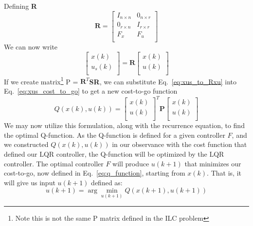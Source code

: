 Defining \textbf{R}
\begin{equation}
    \textbf{R}=\left[\begin{matrix}I_{n\times n}&0_{n\times r}\\0_{r\times n}&I_{r\times r}\\F_x&F_u\\\end{matrix}\right]
\end{equation}
We can now write
\begin{equation}
    \left[\begin{matrix}x\left(k\right)\\u_s\left(k\right)\\\end{matrix}\right]=\textbf{R}\left[\begin{matrix}x\left(k\right)\\u\left(k\right)\\\end{matrix}\right]
    \label{eq:xus_to_Rxu}
\end{equation}
If we create matrix\footnote{Note this is not the same P matrix defined in the ILC problem} P = $\textbf{R}^{T}$\textbf{SR}, we can substitute Eq.~\ref{eq:xus_to_Rxu} into Eq.~\ref{eq:xus_cost_to_go} to get a new cost-to-go function
\begin{equation}
    Q\left(x\left(k\right),u\left(k\right)\right)={\left[\begin{matrix}x\left(k\right)\\u\left(k\right)\\\end{matrix}\right]}^T\textbf{P}\left[\begin{matrix}x\left(k\right)\\u\left(k\right)\\\end{matrix}\right] 
    \label{eq:q_function}
\end{equation}
We may now utilize this formulation, along with the recurrence equation, to find the optimal Q-function. As the Q-function is defined for a given controller $F$, and we constructed $Q\left(x\left(k\right),u\left(k\right)\right)$ in our observance with the cost function that defined our LQR controller, the Q-function will be optimized by the LQR controller.
The optimal controller $F$ will produce $u\left(k+1\right)$ that minimizes our cost-to-go, now defined in Eq.~\ref{eq:q_function}, starting from $x\left(k\right)$. That is, it will give us input $u\left(k+1\right)$ defined as:
\begin{equation}
    u(k+1)=\arg{\min_{u\left(k+1\right)}}Q(x(k+1), u(k+1))
\end{equation}
